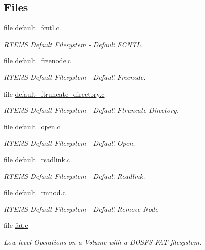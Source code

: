 \subsection*{Files}
\begin{DoxyCompactItemize}
\item 
file \mbox{\hyperlink{default__fcntl_8c}{default\+\_\+fcntl.\+c}}
\begin{DoxyCompactList}\small\item\em R\+T\+E\+MS Default Filesystem -\/ Default F\+C\+N\+TL. \end{DoxyCompactList}\item 
file \mbox{\hyperlink{default__freenode_8c}{default\+\_\+freenode.\+c}}
\begin{DoxyCompactList}\small\item\em R\+T\+E\+MS Default Filesystem -\/ Default Freenode. \end{DoxyCompactList}\item 
file \mbox{\hyperlink{default__ftruncate__directory_8c}{default\+\_\+ftruncate\+\_\+directory.\+c}}
\begin{DoxyCompactList}\small\item\em R\+T\+E\+MS Default Filesystem -\/ Default Ftruncate Directory. \end{DoxyCompactList}\item 
file \mbox{\hyperlink{default__open_8c}{default\+\_\+open.\+c}}
\begin{DoxyCompactList}\small\item\em R\+T\+E\+MS Default Filesystem -\/ Default Open. \end{DoxyCompactList}\item 
file \mbox{\hyperlink{default__readlink_8c}{default\+\_\+readlink.\+c}}
\begin{DoxyCompactList}\small\item\em R\+T\+E\+MS Default Filesystem -\/ Default Readlink. \end{DoxyCompactList}\item 
file \mbox{\hyperlink{default__rmnod_8c}{default\+\_\+rmnod.\+c}}
\begin{DoxyCompactList}\small\item\em R\+T\+E\+MS Default Filesystem -\/ Default Remove Node. \end{DoxyCompactList}\item 
file \mbox{\hyperlink{fat_8c}{fat.\+c}}
\begin{DoxyCompactList}\small\item\em Low-\/level Operations on a Volume with a D\+O\+S\+FS F\+AT filesystem. \end{DoxyCompactList}\item 

\end{DoxyCompactItemize}
